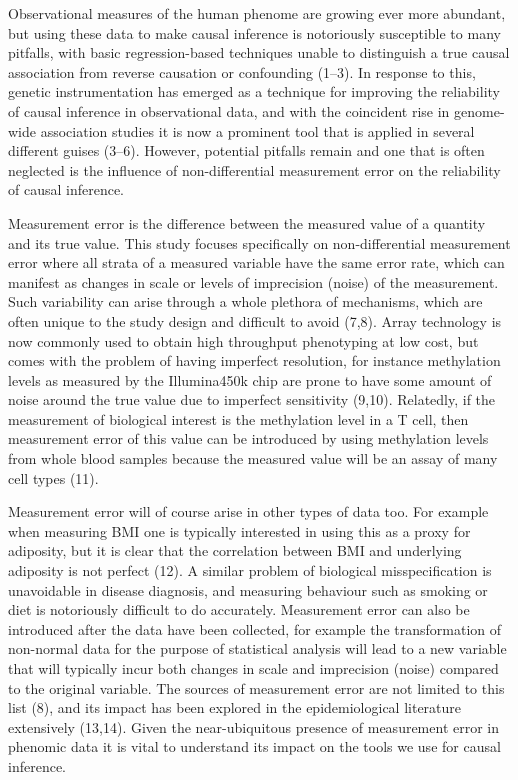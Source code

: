 \documentclass[]{article}
\begin{document}
Observational measures of the human phenome are growing ever more
abundant, but using these data to make causal inference is notoriously
susceptible to many pitfalls, with basic regression-based techniques
unable to distinguish a true causal association from reverse causation
or confounding (1--3). In response to this, genetic instrumentation has
emerged as a technique for improving the reliability of causal inference
in observational data, and with the coincident rise in genome-wide
association studies it is now a prominent tool that is applied in
several different guises (3--6). However, potential pitfalls remain and
one that is often neglected is the influence of non-differential
measurement error on the reliability of causal inference.

Measurement error is the difference between the measured value of a
quantity and its true value. This study focuses specifically on
non-differential measurement error where all strata of a measured
variable have the same error rate, which can manifest as changes in
scale or levels of imprecision (noise) of the measurement. Such
variability can arise through a whole plethora of mechanisms, which are
often unique to the study design and difficult to avoid (7,8). Array
technology is now commonly used to obtain high throughput phenotyping at
low cost, but comes with the problem of having imperfect resolution, for
instance methylation levels as measured by the Illumina450k chip are
prone to have some amount of noise around the true value due to
imperfect sensitivity (9,10). Relatedly, if the measurement of
biological interest is the methylation level in a T cell, then
measurement error of this value can be introduced by using methylation
levels from whole blood samples because the measured value will be an
assay of many cell types (11).

Measurement error will of course arise in other types of data too. For
example when measuring BMI one is typically interested in using this as
a proxy for adiposity, but it is clear that the correlation between BMI
and underlying adiposity is not perfect (12). A similar problem of
biological misspecification is unavoidable in disease diagnosis, and
measuring behaviour such as smoking or diet is notoriously difficult to
do accurately. Measurement error can also be introduced after the data
have been collected, for example the transformation of non-normal data
for the purpose of statistical analysis will lead to a new variable that
will typically incur both changes in scale and imprecision (noise)
compared to the original variable. The sources of measurement error are
not limited to this list (8), and its impact has been explored in the
epidemiological literature extensively (13,14). Given the
near-ubiquitous presence of measurement error in phenomic data it is
vital to understand its impact on the tools we use for causal inference.
\end{document}
